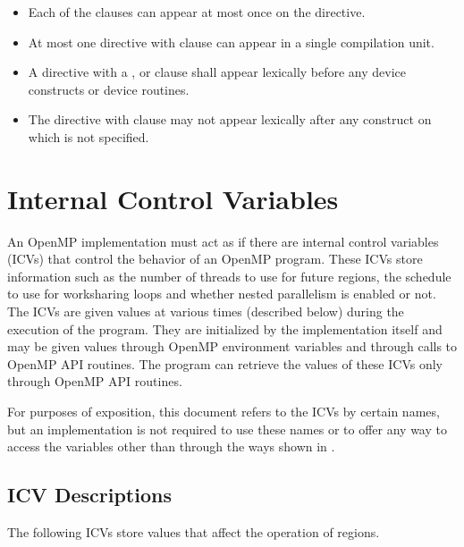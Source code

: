 \begin{itemize}

\item Each of the clauses can appear at most once on the directive.

\item At most one  directive with
 clause can appear in a single compilation
unit.

\item A  directive with a ,
   or  clause shall appear
  lexically before any device constructs or device routines.

\item The  directive with 
clause may not appear lexically after any  construct on which
 is not specified.

\end{itemize}


\section{Internal Control Variables}
\label{sec:Internal Control Variables}
An OpenMP implementation must act as if there are internal control variables (ICVs)
that control the behavior of an OpenMP program. These ICVs store information such as
the number of threads to use for future  regions, the schedule to use for
worksharing loops and whether nested parallelism is enabled or not. The ICVs are given
values at various times (described below) during the execution of the program. They are
initialized by the implementation itself and may be given values through OpenMP
environment variables and through calls to OpenMP API routines. The program can
retrieve the values of these ICVs only through OpenMP API routines.

For purposes of exposition, this document refers to the ICVs by certain names, but an
implementation is not required to use these names or to offer any way to access the
variables other than through the ways shown in
.








\subsection{ICV Descriptions}
\label{subsec:ICV Descriptions}
The following ICVs store values that affect the operation of  regions.


